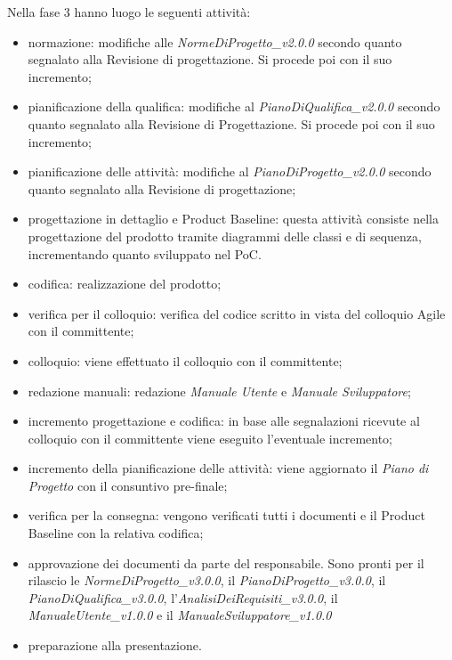 Nella fase 3 hanno luogo le seguenti attività:
\begin{itemize}
	\item normazione: modifiche alle \textit{NormeDiProgetto\_v2.0.0} secondo quanto segnalato alla Revisione di progettazione. Si procede poi con il suo incremento;
	\item pianificazione della qualifica: modifiche al \textit{PianoDiQualifica\_v2.0.0} secondo quanto segnalato alla Revisione di Progettazione. Si procede poi con il suo incremento;
	\item pianificazione delle attività: modifiche al \textit{PianoDiProgetto\_v2.0.0} secondo quanto segnalato alla Revisione di progettazione;
	\item progettazione in dettaglio e Product Baseline: questa attività consiste nella progettazione del prodotto tramite diagrammi delle classi e di sequenza, incrementando quanto sviluppato nel PoC.
	\item codifica: realizzazione del prodotto;
	\item verifica per il colloquio: verifica del codice scritto in vista del colloquio Agile con il committente;
	\item colloquio: viene effettuato il colloquio con il committente;
	\item redazione manuali: redazione \textit{Manuale Utente} e \textit{Manuale Sviluppatore};
	\item incremento progettazione e codifica: in base alle segnalazioni ricevute al colloquio con il committente viene eseguito l'eventuale incremento;
	\item incremento della pianificazione delle attività: viene aggiornato il \textit{Piano di Progetto} con il consuntivo pre-finale;
	\item verifica per la consegna: vengono verificati tutti i documenti e il Product Baseline con la relativa codifica;
	\item approvazione dei documenti da parte del responsabile. Sono pronti per il rilascio le \textit{NormeDiProgetto\_v3.0.0}, il \textit{PianoDiProgetto\_v3.0.0}, il \textit{PianoDiQualifica\_v3.0.0}, l'\textit{AnalisiDeiRequisiti\_v3.0.0}, il
	\textit{ManualeUtente\_v1.0.0} e il \textit{ManualeSviluppatore\_v1.0.0}
	\item preparazione alla presentazione.
\end{itemize}

